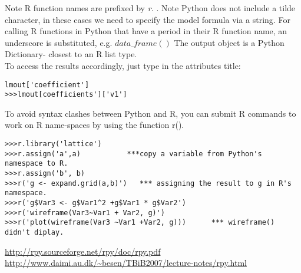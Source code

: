 \documentclass[12pt]{article}
\begin{document}
Note R function names are prefixed by \textit{r.} .
Note Python does not include a tilde character, in these cases we need to specify the model formula via a string. For calling R functions in Python that have a period in their R function name, an underscore is substituted, e.g. $data\_frame() 
$
The output object is a Python Dictionary- closest to an R list type.\\
To access the results accordingly, just type in the attributes title:\\
\begin{verbatim}
lmout['coefficient']
>>>lmout[coefficients']['v1']
\end{verbatim}
To avoid syntax clashes between Python and R, you can submit R commands to work on R name-spaces by using the function r().

\begin{lstlisting}[label=example ,caption= Calling Python in R Example]
>>>r.library('lattice')
>>>r.assign('a',a)           ***copy a variable from Python's namespace to R.
>>>r.assign('b', b)
>>>r('g <- expand.grid(a,b)')   *** assigning the result to g in R's namespace.
>>>r('g$Var3 <- g$Var1^2 +g$Var1 * g$Var2')
>>>r('wireframe(Var3~Var1 + Var2, g)')
>>>r('plot(wireframe(Var3 ~Var1 +Var2, g)))      *** wireframe() didn't diplay.

\end{lstlisting}




\begin{thebibliography}{}
\bibitem{}
\url{http://rpy.sourceforge.net/rpy/doc/rpy.pdf}
\bibitem{}
\url{http://www.daimi.au.dk/~besen/TBiB2007/lecture-notes/rpy.html}

\end{thebibliography}

 
\end{document}
